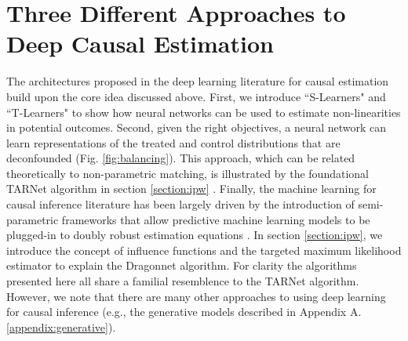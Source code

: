 \section{Three Different Approaches to Deep Causal Estimation}
\label{section:mainbody}

The architectures proposed in the deep learning literature for causal estimation build upon the core idea discussed above. First, we introduce ``S-Learners" and ``T-Learners" to show how neural networks can be used to estimate non-linearities in potential outcomes. Second, given the right objectives, a neural network can learn representations of the treated and control distributions that are deconfounded (Fig. \ref{fig:balancing}). This approach, which can be related theoretically to non-parametric matching, is illustrated by the foundational TARNet algorithm in section \ref{section:ipw} \citep{Shalit2017}. Finally, the machine learning for causal inference literature has been largely driven by the introduction of semi-parametric frameworks that allow predictive machine learning models to be plugged-in to doubly robust estimation equations \citep{van2011targeted,chernozhukov2016double,chernozhukov2021automatic}. In section \ref{section:ipw}, we introduce the concept of influence functions and the targeted maximum likelihood estimator to explain the Dragonnet algorithm. For clarity the algorithms presented here all share a familial resemblence to the TARNet algorithm. However, we note that there are many other approaches to using deep learning for causal inference (e.g., the generative models described in Appendix A.\ref{appendix:generative}).

